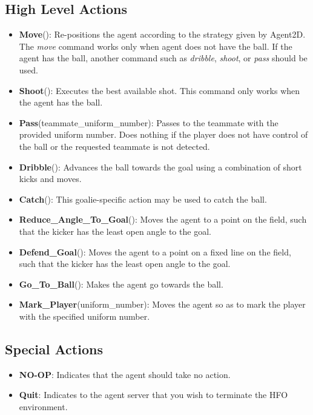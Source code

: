 \documentclass[12pt]{article}
\begin{document}
\subsection{High Level Actions}
\label{sec:high_level_actions}
\begin{itemize}[noitemsep]
\item{\textbf{Move}(): Re-positions the agent according to the
  strategy given by Agent2D. The \textit{move} command works only when
  agent does not have the ball. If the agent has the ball, another
  command such as \textit{dribble}, \textit{shoot}, or \textit{pass}
  should be used.}
\item{\textbf{Shoot}(): Executes the best available shot. This command
  only works when the agent has the ball.}
\item{\textbf{Pass}(teammate\_uniform\_number): Passes to the teammate
  with the provided uniform number. Does nothing if the player does
  not have control of the ball or the requested teammate is not
  detected.}
\item{\textbf{Dribble}(): Advances the ball towards the goal using a
  combination of short kicks and moves.}
\item{\textbf{Catch}(): This goalie-specific action may be used to
  catch the ball.}
\item{\textbf{Reduce\_Angle\_To\_Goal}(): Moves the agent to a point on the field,
	such that the kicker has the least open angle to the goal. }
\item{\textbf{Defend\_Goal}(): Moves the agent to a point on a fixed line on the field,
	such that the kicker has the least open angle to the goal.}
\item{\textbf{Go\_To\_Ball}(): Makes the agent go towards the ball.}
\item{\textbf{Mark\_Player}(uniform\_number): Moves the agent so as to mark the player
	with the specified uniform number.}

\end{itemize}

\subsection{Special Actions}
\begin{itemize}[noitemsep]
\item{\textbf{NO-OP}: Indicates that the agent should take no action.}
\item{\textbf{Quit}: Indicates to the agent server that you wish to
  terminate the HFO environment.}
\end{itemize}
\end{document}
